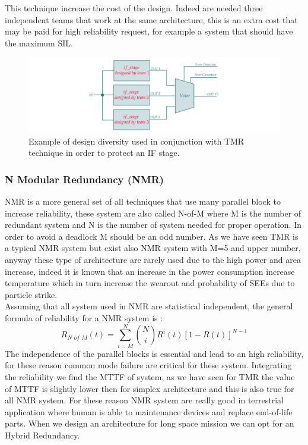 {{{{{        		    This technique increase the cost of the design. Indeed are needed three independent teams that work at the same architecture, this is an extra cost that may be paid for high reliability request, for example a system that should have the maximum SIL. 
            		
            		\begin{figure}[H]
            			\centering
            			\includegraphics[scale=0.2,center]{./images/TMR_Design_Diversity.png}
            			\caption{Example of design diversity used in conjunction with TMR technique in order to protect an IF stage.}
            			\label{fig:TMR5}
            		\end{figure} 
            		
        		}
		    }
		    \subsubsection{N Modular Redundancy (NMR)}{
		        NMR is a more general set of all techniques that use many parallel block to increase reliability, these system are also called N-of-M where M is the number of redundant system and N is the number of system needed for proper operation. 
		        In order to avoid a deadlock M should be an odd number. As we have seen TMR is a typical NMR system but exist also NMR system with M=5 and upper number, anyway these type of architecture are rarely used due to the high power and area increase, indeed it is known that an increase in the power consumption increase temperature which in turn increase the wearout and probability of SEEs due to particle strike. \\
		        
		        Assuming that all system used in NMR are statistical independent, the general formula of reliability for a NMR system is :
		        \begin{equation}
		            \label{eq:R_NMR}
		            R_{N\,\,of\,\,M}(t) = \sum_{i=M}^N \binom{N}{i} R^i(t) [ 1- R(t)]^{N-1}
		        \end{equation}
		        The independence of the parallel blocks is essential and lead to an high reliability, for these reason common mode failure are critical for these system. 
		        Integrating the reliability we find the MTTF of system, as we have seen for TMR the value of MTTF is slightly lower then for simplex architecture and this is also true for all NMR system. 
		        For these reason NMR system are really good in terrestrial application where human is able to maintenance devices and replace end-of-life parts. When we design an architecture for long space mission we can opt for an Hybrid Redundancy.\\
		        
}}}}

